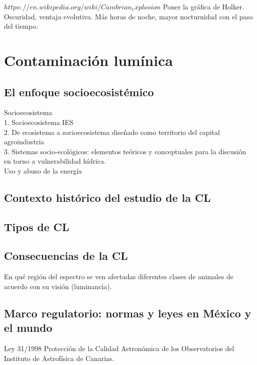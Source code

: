 $https://en.wikipedia.org/wiki/Cambrian_explosion$	
Poner la gráfica de Holker. Oscuridad, ventaja evolutiva. Más horas de noche, mayor nocturnidad con el paso del tiempo.\\

\section{Contaminación lumínica}

\subsection{El enfoque socioecosistémico}

Socioecosistema\\

1. Socioecosistema IES\\

2. De ecosistema a socioecosistema diseñado
como territorio del capital agroindustria\\

3. Sistemas socio-ecológicos: elementos teóricos y conceptuales para la discusión en torno a vulnerabilidad hídrica.\\

Uso y abuso de la energía\\

\subsection{Contexto histórico del estudio de la CL}

\subsection{Tipos de CL}

\subsection{Consecuencias de la CL}

En qué región del espectro se ven afectadas diferentes clases de animales de acuerdo con su visión (luminancia).\\

\subsection{Marco regulatorio: normas y leyes en México y el mundo}

Ley 31/1998 Protección de la Calidad Astronómica de los Observatorios del Instituto de Astrofísica de Canarias.\\

